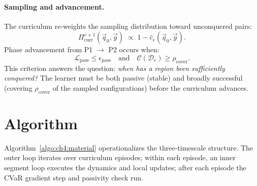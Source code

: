 \paragraph{Sampling and advancement.}
The curriculum re-weights the sampling distribution toward
unconquered pairs:
\begin{equation}
  \Pi_{\mathrm{curr}}^{e+1}(\vec{q}_0,\vec{g})
  \;\propto\; 1 - \hat{c}_e(\vec{q}_0,\vec{g}).
  \label{eq:ch4:sampling}
\end{equation}
Phase advancement from P1 $\to$ P2 occurs when:
\begin{equation}
  \mathcal{L}_{\mathrm{pass}} \leq \epsilon_{\mathrm{pass}}
  \quad\text{and}\quad
  \mathcal{C}(\mathcal{D}_e) \geq \rho_{\mathrm{cover}}.
  \label{eq:ch4:advance}
\end{equation}
This criterion answers the question: \emph{when has a region been
sufficiently conquered?}
The learner must be both passive (stable) and broadly successful
(covering $\rho_{\mathrm{cover}}$ of the sampled configurations)
before the curriculum advances.

\section{Algorithm}
\label{sec:ch4:algorithm}

Algorithm~\ref{algo:ch4:material} operationalizes the three-timescale
structure.
The outer loop iterates over curriculum episodes; within each episode,
an inner segment loop executes the dynamics and local updates; after
each episode the CVaR gradient step and passivity check run.


